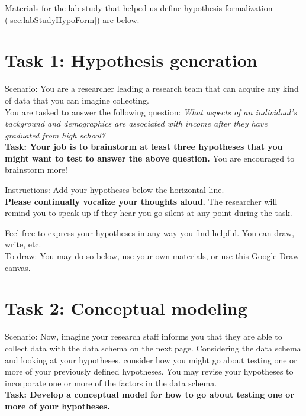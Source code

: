 Materials for the lab study that helped us define hypothesis formalization
(\autoref{sec:labStudyHypoForm}) are below. 

\section{Task 1: Hypothesis generation}

Scenario: You are a researcher leading a research team that can acquire any kind
of data that you can imagine collecting.\\

You are tasked to answer the following question: \textit{What aspects of an
individual’s background and demographics are associated with income after they
have graduated from high school?} \\

\textbf{Task: Your job is to brainstorm at least three hypotheses that you might
want to test to answer the above question.} You are encouraged to brainstorm
more!

Instructions: Add your hypotheses below the horizontal line. \\

\textbf{Please continually vocalize your thoughts aloud.} The researcher will remind you
to speak up if they hear you go silent at any point during the task. \\

\hrulefill

Feel free to express your hypotheses in any way you find helpful. You can draw,
write, etc. \\

To draw: You may do so below, use your own materials, or use this Google Draw
canvas.

\clearpage

\section{Task 2: Conceptual modeling}

Scenario: Now, imagine your research staff informs you that they are able to
collect data with the data schema on the next page. Considering the data schema
and looking at your hypotheses, consider how you might go about testing one or
more of your previously defined hypotheses. You may revise your hypotheses to
incorporate one or more of the factors in the data schema. \\

\textbf{Task: Develop a conceptual model for how to go about testing one or more of your
hypotheses.} \\

